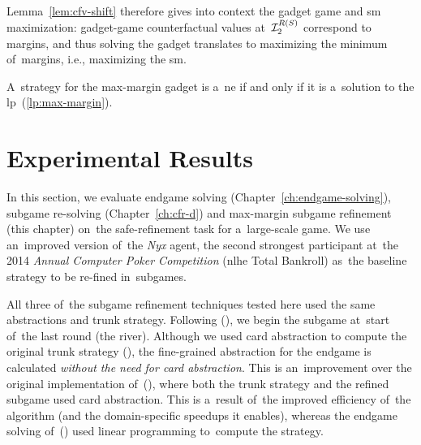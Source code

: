 Lemma~\ref{lem:cfv-shift} therefore gives into context the gadget game and \acrshort{sm} maximization:
gadget-game counterfactual values at~$\mathcal{I}_2^{R(S)}$ correspond to margins, and thus solving the gadget translates to maximizing the minimum of~margins, i.e., maximizing the \acrlong{sm}.
\begin{framed}
  \begin{cor}
    A~strategy for the max-margin gadget is a~\acrlong{ne} if and only if it is a~solution to the \acrshort{lp}~(\ref{lp:max-margin}).
  \end{cor}
\end{framed}

\section{Experimental Results}
\label{sec:max-margin-experiments}
In this section, we evaluate endgame solving (Chapter~\ref{ch:endgame-solving}), subgame re-solving (Chapter~\ref{ch:cfr-d}) and max-margin subgame refinement (this chapter) on~the safe-refinement task for a~large-scale game.
We use an~improved version of~the \emph{Nyx} agent, the second strongest participant at~the 2014 \emph{Annual Computer Poker Competition} (\acrlong{nlhe} Total Bankroll)\footnotemark{} as~the baseline strategy to be re-fined in~subgames.

All three of~the subgame refinement techniques tested here used the same abstractions and trunk strategy.
Following (\cite{Ganzfried2015endgame}), we begin the subgame at~start of~the last round (the river).
Although we used card abstraction to compute the original trunk strategy (\cite{Schmid2015automatic, Johanson2013evaluating}), the fine-grained abstraction for the endgame is calculated \emph{without the need for card abstraction}.
This is an~improvement over the original implementation of~(\cite{Ganzfried2015endgame}), where both the trunk strategy and the refined subgame used card abstraction.
This is a~result of~the improved efficiency of~the \cfrplus algorithm (and the domain-specific speedups it enables), whereas the endgame solving of~(\cite{Ganzfried2015endgame}) used linear programming to~compute the strategy.

